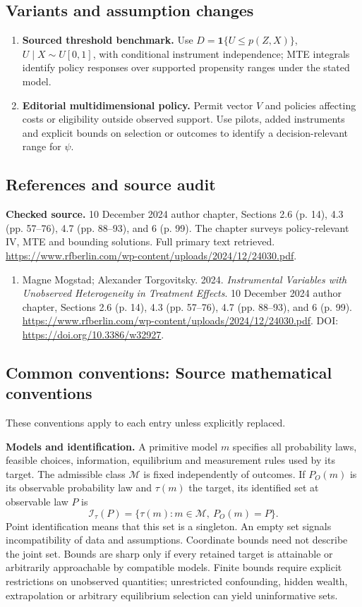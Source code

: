 \documentclass[11pt,a4paper]{article}
\begin{document}
\subsection*{Variants and assumption changes}
\begin{enumerate}
\item \textbf{Sourced threshold benchmark.} Use \(D=\mathbf1\{U\leq p(Z,X)\}\), \(U\mid X\sim U[0,1]\), with conditional instrument independence; MTE integrals identify policy responses over supported propensity ranges under the stated model.
\item \textbf{Editorial multidimensional policy.} Permit vector \(V\) and policies affecting costs or eligibility outside observed support. Use pilots, added instruments and explicit bounds on selection or outcomes to identify a decision-relevant range for \(\psi\).
\end{enumerate}
\subsection*{References and source audit}
\textbf{Checked source.} 10 December 2024 author chapter, Sections 2.6 (p. 14), 4.3 (pp. 57--76), 4.7 (pp. 88--93), and 6 (p. 99). The chapter surveys policy-relevant IV, MTE and bounding solutions. Full primary text retrieved. \url{https://www.rfberlin.com/wp-content/uploads/2024/12/24030.pdf}.
\begin{enumerate}\raggedright
\item\hypertarget{definitions:source:30007706:1}{} Magne Mogstad; Alexander Torgovitsky. 2024. \emph{Instrumental Variables with Unobserved Heterogeneity in Treatment Effects}. 10 December 2024 author chapter, Sections 2.6 (p. 14), 4.3 (pp. 57--76), 4.7 (pp. 88--93), and 6 (p. 99).
\url{https://www.rfberlin.com/wp-content/uploads/2024/12/24030.pdf}.
DOI: \url{https://doi.org/10.3386/w32927}.
\end{enumerate}

\subsection*{Common conventions: Source mathematical conventions}

These conventions apply to each entry unless explicitly replaced.

\textbf{Models and identification.} A primitive model \(m\) specifies all probability laws, feasible choices, information, equilibrium and measurement rules used by its target. The admissible class \(\mathcal M\) is fixed independently of outcomes. If \(P_O(m)\) is its observable probability law and \(\tau(m)\) the target, its identified set at observable law \(P\) is
\[
 \mathcal I_\tau(P)=\{\tau(m):m\in\mathcal M,\ P_O(m)=P\}.
\]
Point identification means that this set is a singleton. An empty set signals incompatibility of data and assumptions. Coordinate bounds need not describe the joint set. Bounds are sharp only if every retained target is attainable or arbitrarily approachable by compatible models. Finite bounds require explicit restrictions on unobserved quantities; unrestricted confounding, hidden wealth, extrapolation or arbitrary equilibrium selection can yield uninformative sets.
\end{document}
